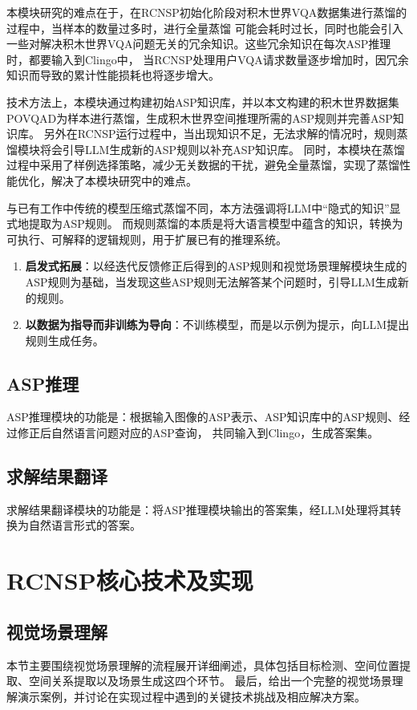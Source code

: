 本模块研究的难点在于，在RCNSP初始化阶段对积木世界VQA数据集进行蒸馏的过程中，当样本的数量过多时，进行全量蒸馏
可能会耗时过长，同时也能会引入一些对解决积木世界VQA问题无关的冗余知识。这些冗余知识在每次ASP推理时，都要输入到Clingo中，
当RCNSP处理用户VQA请求数量逐步增加时，因冗余知识而导致的累计性能损耗也将逐步增大。

技术方法上，本模块通过构建初始ASP知识库，并以本文构建的积木世界数据集POVQA\-D为样本进行蒸馏，生成积木世界空间推理所需的ASP规则并完善ASP知识库。
另外在RCNSP运行过程中，当出现知识不足，无法求解的情况时，规则蒸馏模块将会引导LLM生成新的ASP规则以补充ASP知识库。
同时，本模块在蒸馏过程中采用了样例选择策略，减少无关数据的干扰，避免全量蒸馏，实现了蒸馏性能优化，解决了本模块研究中的难点。

与已有工作中传统的模型压缩式蒸馏不同，本方法强调将LLM中“隐式的知识”显式地提取为ASP规则。
而规则蒸馏的本质是将大语言模型中蕴含的知识，转换为可执行、可解释的逻辑规则，用于扩展已有的推理系统。
\begin{enumerate}[nosep]
\item \textbf{启发式拓展}：以经迭代反馈修正后得到的ASP规则和视觉场景理解模块生成的ASP规则为基础，当发现这些ASP规则无法解答某个问题时，引导LLM生成新的规则。
\item \textbf{以数据为指导而非训练为导向}：不训练模型，而是以示例为提示，向LLM提出规则生成任务。
\end{enumerate}
\subsection{ASP推理}
ASP推理模块的功能是：根据输入图像的ASP表示、ASP知识库中的ASP规则、经过修正后自然语言问题对应的ASP查询，
共同输入到Clingo，生成答案集。

\subsection{求解结果翻译}
求解结果翻译模块的功能是：将ASP推理模块输出的答案集，经LLM处理将其转换为自然语言形式的答案。
\section{RCNSP核心技术及实现}
\subsection{视觉场景理解}
本节主要围绕视觉场景理解的流程展开详细阐述，具体包括目标检测、空间位置提取、空间关系提取以及场景生成这四个环节。
最后，给出一个完整的视觉场景理解演示案例，并讨论在实现过程中遇到的关键技术挑战及相应解决方案。
